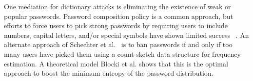  One mediation for dictionary attacks is eliminating the existence of weak or popular passwords. Password composition policy is a common approach, but efforts to force users to pick strong passwords by requiring users to include numbers, capital letters, and/or special symbols have shown limited success ~\cite{KSKMBCCE:SIGCHI11, BKPS:ACMEC13}. An alternate approach of Schechter et al.~\cite{HTS:SchHerMit10} is to ban passwords if and only if too many users have picked them using a count-sketch data structure for frequency estimation. A theoretical model Blocki et al. \cite{BKPS:ACMEC13} shows that this is the optimal approach to boost the minimum entropy of the password distribution.  




